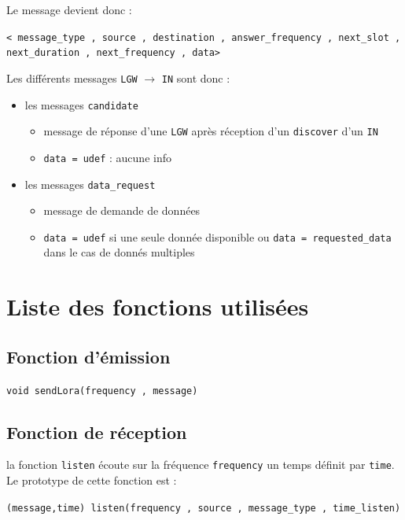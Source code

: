 Le message devient donc :

\begin{center}
\texttt{< message\_type , source , destination , answer\_frequency , next\_slot , next\_duration , next\_frequency , data>}
\end{center}

Les différents messages \texttt{LGW} $\rightarrow$ \texttt{IN} sont donc :
\begin{itemize}
    \item les messages \texttt{candidate} %
    \begin{itemize}
      \item message de réponse d'une \texttt{LGW} après réception d'un \texttt{discover} d'un \texttt{IN}
      \item \texttt{data = udef} : aucune info
    \end{itemize}
    \item les messages \texttt{data\_request}
    \begin{itemize}
      \item message de demande de données
      \item \texttt{data = udef} si une seule donnée disponible ou \texttt{data = requested\_data} dans le cas de donnés multiples
    \end{itemize}
\end{itemize}

\section{Liste des fonctions utilisées}

\subsection{Fonction d'émission}

\texttt{void sendLora(frequency , message)}

\subsection{Fonction de réception}

la fonction \texttt{listen} écoute sur la fréquence \texttt{frequency} un temps définit par \texttt{time}. Le prototype de cette fonction est :

\begin{center}
\texttt{(message,time) listen(frequency , source , message\_type , time\_listen)}
\end{center}

